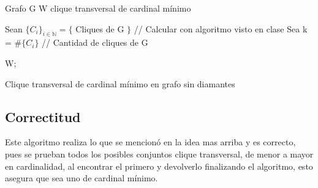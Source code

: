 \documentclass[10pt,a4paper]{article}
\begin{document}
\begin{algorithm}[H]
	\begin{algorithmic}[1]
		\REQUIRE Grafo G
		\ENSURE W clique transversal de cardinal mínimo

        \STATE Sean $\{C_i\}_{i \in \mathbb{N}} = \{$ Cliques de G $\}$ // Calcular con algoritmo visto en clase
        \STATE Sea k = $\#\{C_i\}$ // Cantidad de cliques de G
    
		            \RETURN W;
		        \ENDIF
		    \ENDFOR
		\ENDFOR
		
	\end{algorithmic}
	\caption{Clique transversal de cardinal mínimo en grafo sin diamantes}\label{alg:alg3}
\end{algorithm}

\subsection{Correctitud}
Este algoritmo realiza lo que se mencionó en la idea mas arriba y es correcto, pues se prueban todos los posibles conjuntos clique transversal, de menor a mayor en cardinalidad, al encontrar el primero y devolverlo finalizando el algoritmo, esto asegura que sea uno de cardinal mínimo.
\end{document}
